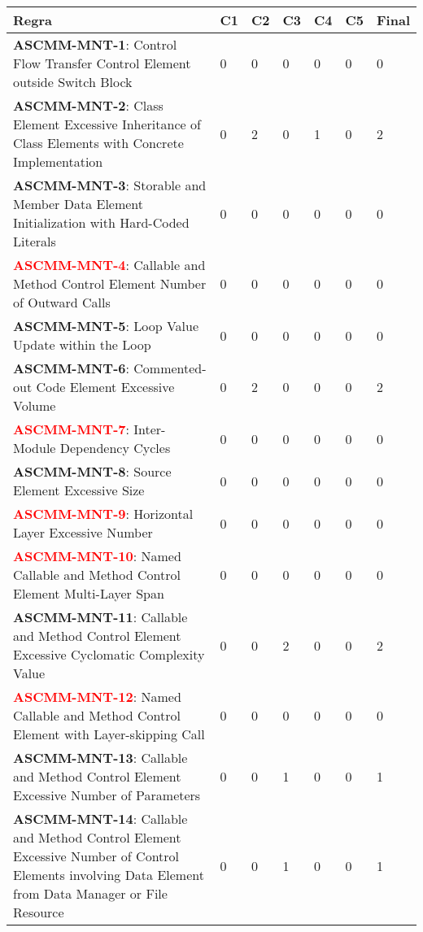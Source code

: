 \documentclass[openany,10pt,a4paper]{article}
\begin{document}
\begin{longtable}%
	\caption{Regras da caraterística manutenibilidade}
	\begin{tabular}{|p{3in}|p{0.3in}|p{0.3in}|p{0.3in}|p{0.3in}|p{0.3in}|p{0.4in}|}
		\hline	
		\textbf{Regra} & \textbf{C1} & \textbf{C2} & \textbf{C3} & \textbf{C4} & \textbf{C5} & \textbf{Final} \\ \hline
		\textbf{ASCMM-MNT-1}: Control Flow Transfer Control Element outside Switch Block & 0 & 0 & 0 & 0 & 0 & 0 \\ \hline
\textbf{ASCMM-MNT-2}: Class Element Excessive Inheritance of Class Elements with Concrete Implementation & 0 & 2 & 0 & 1 & 0 & 2 \\ \hline
\textbf{ASCMM-MNT-3}: Storable and Member Data Element Initialization with Hard-Coded Literals & 0 & 0 & 0 & 0 & 0 & 0 \\ \hline
\textcolor{red}{\textbf{ASCMM-MNT-4}}: Callable and Method Control Element Number of Outward Calls & 0 & 0 & 0 & 0 & 0 & 0 \\ \hline
\textbf{ASCMM-MNT-5}: Loop Value Update within the Loop & 0 & 0 & 0 & 0 & 0 & 0 \\ \hline
\textbf{ASCMM-MNT-6}: Commented-out Code Element Excessive Volume & 0 & 2 & 0 & 0 & 0 & 2 \\ \hline
\textcolor{red}{\textbf{ASCMM-MNT-7}}: Inter-Module Dependency Cycles & 0 & 0 & 0 & 0 & 0 & 0 \\ \hline
\textbf{ASCMM-MNT-8}: Source Element Excessive Size & 0 & 0 & 0 & 0 & 0 & 0 \\ \hline
\textcolor{red}{\textbf{ASCMM-MNT-9}}: Horizontal Layer Excessive Number & 0 & 0 & 0 & 0 & 0 & 0 \\ \hline
\textcolor{red}{\textbf{ASCMM-MNT-10}}: Named Callable and Method Control Element Multi-Layer Span & 0 & 0 & 0 & 0 & 0 & 0 \\ \hline
\textbf{ASCMM-MNT-11}: Callable and Method Control Element Excessive Cyclomatic Complexity Value & 0 & 0 & 2 & 0 & 0 & 2 \\ \hline
\textcolor{red}{\textbf{ASCMM-MNT-12}}: Named Callable and Method Control Element with Layer-skipping Call & 0 & 0 & 0 & 0 & 0 & 0 \\ \hline
\textbf{ASCMM-MNT-13}: Callable and Method Control Element Excessive Number of Parameters & 0 & 0 & 1 & 0 & 0 & 1 \\ \hline
\textbf{ASCMM-MNT-14}: Callable and Method Control Element Excessive Number of Control Elements involving Data Element from Data Manager or File Resource & 0 & 0 & 1 & 0 & 0 & 1 \\ \hline

\end{tabular}
\end{longtable}
\end{document}
